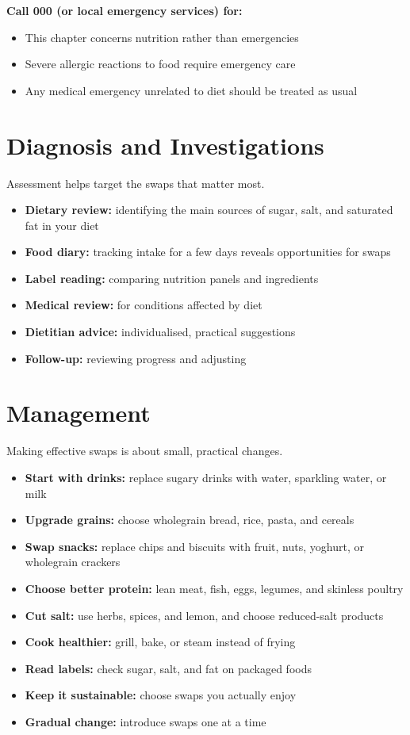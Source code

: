 \textbf{Call 000 (or local emergency services) for:}
\begin{itemize}
    \item This chapter concerns nutrition rather than emergencies
    \item Severe allergic reactions to food require emergency care
    \item Any medical emergency unrelated to diet should be treated as usual
\end{itemize}

\section*{Diagnosis and Investigations}
Assessment helps target the swaps that matter most.

\begin{itemize}
    \item \textbf{Dietary review:} identifying the main sources of sugar, salt, and saturated fat in your diet
    \item \textbf{Food diary:} tracking intake for a few days reveals opportunities for swaps
    \item \textbf{Label reading:} comparing nutrition panels and ingredients
    \item \textbf{Medical review:} for conditions affected by diet
    \item \textbf{Dietitian advice:} individualised, practical suggestions
    \item \textbf{Follow-up:} reviewing progress and adjusting
\end{itemize}

\section*{Management}
Making effective swaps is about small, practical changes.

\begin{itemize}
    \item \textbf{Start with drinks:} replace sugary drinks with water, sparkling water, or milk
    \item \textbf{Upgrade grains:} choose wholegrain bread, rice, pasta, and cereals
    \item \textbf{Swap snacks:} replace chips and biscuits with fruit, nuts, yoghurt, or wholegrain crackers
    \item \textbf{Choose better protein:} lean meat, fish, eggs, legumes, and skinless poultry
    \item \textbf{Cut salt:} use herbs, spices, and lemon, and choose reduced-salt products
    \item \textbf{Cook healthier:} grill, bake, or steam instead of frying
    \item \textbf{Read labels:} check sugar, salt, and fat on packaged foods
    \item \textbf{Keep it sustainable:} choose swaps you actually enjoy
    \item \textbf{Gradual change:} introduce swaps one at a time
\end{itemize}

